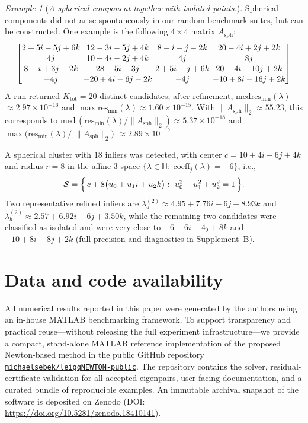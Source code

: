 \documentclass[preprint,12pt]{elsarticle}  %
\theoremstyle{definition}
\theoremstyle{definition}
\theoremstyle{definition}
\theoremstyle{definition}
\theoremstyle{definition}
\theoremstyle{remark}
\theoremstyle{remark}
\newtheorem{Ex}{Example}
\theoremstyle{remark}
\DeclareRobustCommand{\i}{\ensuremath{\mathbf{i}}}
\DeclareRobustCommand{\j}{\ensuremath{\mathbf{j}}}
\DeclareRobustCommand{\k}{\ensuremath{\mathbf{k}}}
\def\i{i}\def\j{j}\def\k{k}%
\newcommand{\HH}{\mathbb{H}}
\begin{document}
\begin{Ex}[\emph{A spherical component together with isolated points.}]
\label{ex:byprod_spherical}
Spherical components did not arise spontaneously in our random benchmark suites, but can be constructed. One example is the following $4\times4$ matrix $A_{\mathrm{sph}}$:
{\small
\[
\setlength{\arraycolsep}{2pt}\renewcommand{\arraystretch}{1.05}
\begin{bmatrix}
2+5\i-5\j+6\k & 12-3\i-5\j+4\k & 8-\i-\j-2\k & 20-4\i+2\j+2\k\\
4\j & 10+4\i-2\j+4\k & 4\j & 8\j\\
8-\i+3\j-2\k & 28-5\i-3\j & 2+5\i-\j+6\k & 20-4\i+10\j+2\k\\
-4\j & -20+4\i-6\j-2\k & -4\j & -10+8\i-16\j+2\k
\end{bmatrix}
\]}
A run returned $K_{\mathrm{tot}}=20$ distinct candidates; after refinement,
$\mathrm{med}\mathrm{res}_{\min}(\lambda)$ $\approx 2.97\times10^{-16}$ and
$\max \mathrm{res}_{\min}(\lambda)\approx 1.60\times10^{-15}$.
With $\|A_{\mathrm{sph}}\|_2\approx 55.23$, this corresponds to
$\mathrm{med}\,(\mathrm{res}_{\min}(\lambda)/\|A_{\mathrm{sph}}\|_2)\approx 5.37\times10^{-18}$ and
$\max (\mathrm{res}_{\min}(\lambda)/$ $\|A_{\mathrm{sph}}\|_2)$ $\approx 2.89\times10^{-17}$.

A spherical cluster with $18$ inliers was detected, with center $c=10+4\i-6\j+4\k$ and radius $r=8$ in the affine $3$-space
$\{\lambda\in\HH:\ \mathrm{coeff}_{\j}(\lambda)=-6\}$, i.e.,
\[
\mathcal S=\Bigl\{\,c+8\bigl(u_0+u_1\i+u_2\k\bigr):\ u_0^2+u_1^2+u_2^2=1\,\Bigr\}.
\]
Two representative refined inliers are
$\lambda^{(2)}_{a}\approx 4.95 + 7.76\i - 6\j + 8.93\k$ and
$\lambda^{(2)}_{b}\approx 2.57 + 6.92\i - 6\j + 3.50\k$,
while the remaining two candidates were classified as isolated and were very close to
$-6+6\i-4\j+8\k$ and $-10+8\i-8\j+2\k$ (full precision and diagnostics in Supplement~B).
\end{Ex}

\section*{Data and code availability}
\label{sec:data_code_availability}
All numerical results reported in this paper were generated by the authors using an in-house MATLAB benchmarking framework.
To support transparency and practical reuse—without releasing the full experiment infrastructure—we provide a compact,
stand-alone MATLAB reference implementation of the proposed Newton-based method in the public GitHub repository
\href{https://github.com/michaelsebek/leigqNEWTON-public}{\texttt{michaelsebek/leigqNEWTON-public}}.
The repository contains the solver, residual-certificate validation for all accepted eigenpairs, user-facing documentation, and a curated bundle of reproducible examples.
An immutable archival snapshot of the software is deposited on Zenodo (DOI: \url{https://doi.org/10.5281/zenodo.18410141}).
\end{document}
